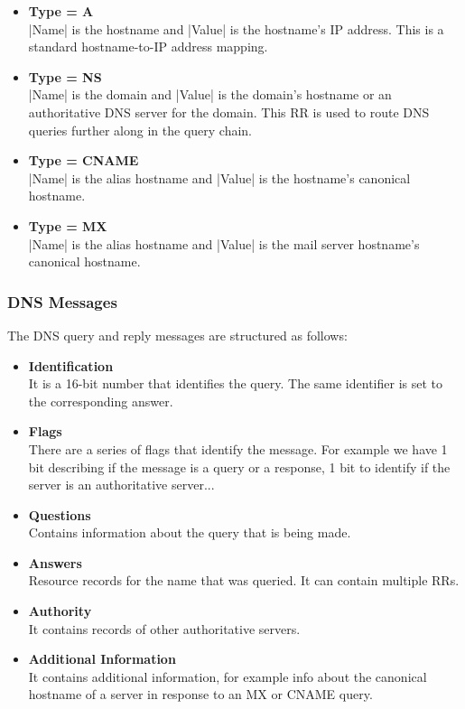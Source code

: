 \documentclass{article}
\begin{document}
\begin{itemize}
	\item \textbf{Type = A}
	\vspace{.2cm} \\
	\cverb|Name| is the hostname and \cverb|Value| is the hostname's IP address. This is a standard hostname-to-IP address mapping.
	\item \textbf{Type = NS}
	\vspace{.2cm} \\
	\cverb|Name| is the domain and \cverb|Value| is the domain's hostname or an authoritative DNS server for the domain. This RR is used to route DNS queries further along in the query chain.
	\item \textbf{Type = CNAME}
	\vspace{.2cm} \\
	\cverb|Name| is the alias hostname and \cverb|Value| is the hostname's canonical hostname.
	\item \textbf{Type = MX}
	\vspace{.2cm} \\
	\cverb|Name| is the alias hostname and \cverb|Value| is the mail server hostname's canonical hostname.
\end{itemize}

\subsubsection{DNS Messages}
The DNS query and reply messages are structured as follows:

\begin{itemize}
	\item \textbf{Identification}
	\vspace{.2cm} \\
	It is a 16-bit number that identifies the query. The same identifier is set to the corresponding answer.
	\item \textbf{Flags}
	\vspace{.2cm} \\
	There are a series of flags that identify the message. For example we have 1 bit describing if the message is a query or a response, 1 bit to identify if the server is an authoritative server...
	\item \textbf{Questions}
	\vspace{.2cm} \\
	Contains information about the query that is being made.
	\item \textbf{Answers}
	\vspace{.2cm} \\
	Resource records for the name that was queried. It can contain multiple RRs.
	\item \textbf{Authority}
	\vspace{.2cm} \\
	It contains records of other authoritative servers.
	\item \textbf{Additional Information}
	\vspace{.2cm} \\
	It contains additional information, for example info about the canonical hostname of a server in response to an MX or CNAME query.
\end{itemize}
\end{document}
